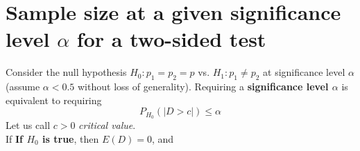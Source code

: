 \documentclass[14pt]{article}
\begin{document}


\section{Sample size at a given significance level $\alpha$ for a two-sided test}
Consider the null hypothesis $H_{0}: p_{1}=p_{2}=p$ vs. $H_{1}: p_{1}\neq p_{2}$ at significance level $\alpha$ (assume $\alpha < 0.5 $ without loss of generality).
Requiring a \textbf{significance level $\alpha$} is equivalent to requiring
\begin{equation}\label{eq: critical region alfa}
P_{H_{0}}(\left | D>c \right |)\leq\alpha
\end{equation}
Let us call $c>0$ \textit{critical value}.\\
\newline
If \textbf{If $H_{0}$ is true}, then $E(D)=0$, and
\end{document}
